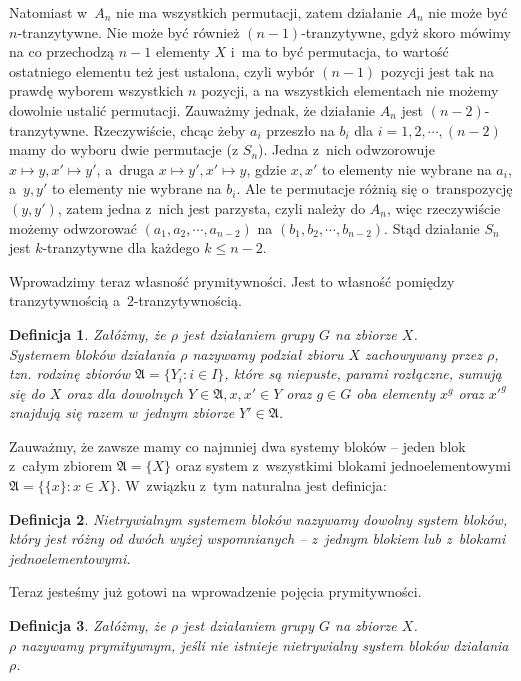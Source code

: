 \documentclass[licencjacka]{pracamgr}
\newtheorem{deff}{Definicja}[section]
\begin{document}
Natomiast w~$A_n$ nie ma wszystkich permutacji, zatem działanie $A_n$ nie może być $n$-tranzytywne.
Nie może być również $(n-1)$-tranzytywne, gdyż skoro mówimy na co przechodzą $n-1$ elementy $X$ i~ma to być permutacja,
to wartość ostatniego elementu też jest ustalona, czyli wybór $(n-1)$ pozycji jest tak na prawdę wyborem wszystkich $n$ pozycji, 
a na wszystkich elementach nie możemy dowolnie ustalić permutacji.
Zauważmy jednak, że działanie $A_n$ jest $(n-2)$-tranzytywne. 
Rzeczywiście, chcąc żeby $a_i$ przeszło na $b_i$ dla $i = 1, 2, \cdots, (n-2)$ mamy do wyboru dwie permutacje (z $S_n$).
Jedna z~nich odwzorowuje $x \mapsto y, x' \mapsto y'$, a~druga $x \mapsto y', x' \mapsto y$, 
gdzie $x, x'$ to elementy nie wybrane na $a_i$, a~$y, y'$ to elementy nie wybrane na $b_i$. 
Ale te permutacje różnią się o~transpozycję $(y, y')$, zatem jedna z~nich jest parzysta, czyli należy do $A_n$,
więc rzeczywiście możemy odwzorować $(a_1, a_2, \cdots, a_{n-2})$ na $(b_1, b_2, \cdots, b_{n-2})$.
Stąd działanie $S_n$ jest $k$-tranzytywne dla każdego $k \le n-2$.

Wprowadzimy teraz własność prymitywności. 
Jest to własność pomiędzy tranzytywnością a~$2$-tranzytywnością.

\begin{deff}
	Załóżmy, że $\rho$ jest działaniem grupy $G$ na zbiorze $X$. \\
	\emph{Systemem bloków} działania $\rho$ nazywamy podział zbioru $X$ zachowywany przez $\rho$,
	tzn. rodzinę zbiorów $\mathfrak{A} = \{Y_i \colon i \in I \}$, które są niepuste, parami rozłączne, sumują się do $X$ 
	oraz dla dowolnych $Y \in \mathfrak{A}, x, x' \in Y$ oraz $g \in G$ 
	oba elementy $x^g$ oraz $x'^g$ znajdują się razem w~jednym zbiorze $Y' \in \mathfrak{A}$.
\end{deff}

Zauważmy, że zawsze mamy co najmniej dwa systemy bloków -- jeden blok z~całym zbiorem $\mathfrak{A} = \{X\}$
oraz system z~wszystkimi blokami jednoelementowymi $\mathfrak{A} = \{\{x\} \colon x \in X\}$.
W~związku z~tym naturalna jest definicja:

\begin{deff}
	\emph{Nietrywialnym systemem bloków} nazywamy dowolny system bloków, 
	który jest różny od dwóch wyżej wspomnianych -- z~jednym blokiem lub z~blokami jednoelementowymi.
\end{deff}

Teraz jesteśmy już gotowi na wprowadzenie pojęcia prymitywności.

\begin{deff}
	Załóżmy, że $\rho$ jest działaniem grupy $G$ na zbiorze $X$. \\
	\emph{$\rho$ nazywamy prymitywnym}, jeśli nie istnieje nietrywialny system bloków działania $\rho$.
\end{deff}
\end{document}
